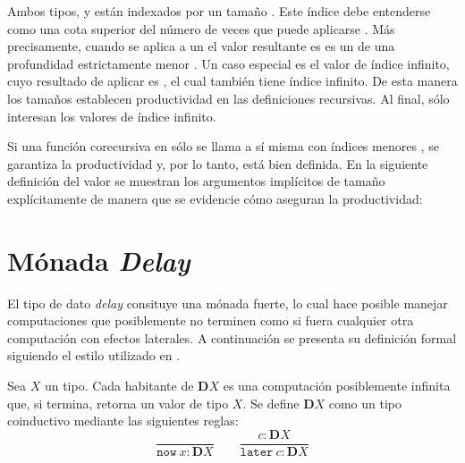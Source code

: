 Ambos tipos,  y  están indexados por un tamaño . Este índice debe entenderse como una cota superior del número de veces que puede aplicarse . Más precisamente, cuando se aplica  a un  \AgdaSymbol{:}   el valor resultante es es un  \AgdaSymbol{:}   de una profundidad estrictamente menor  \AgdaSymbol{<} . Un caso especial es el valor  \AgdaSymbol{:}  \AgdaArgument{$\infty$} de índice infinito, cuyo resultado de aplicar  es  \AgdaSymbol{:}  \AgdaArgument{$\infty$}, el cual también tiene índice infinito. De esta manera los tamaños establecen productividad en las definiciones recursivas. Al final, sólo interesan los valores  \AgdaSymbol{:}  \AgdaArgument{$\infty$} de índice infinito.

Si una función corecursiva en   sólo se llama a sí misma con índices menores  \AgdaSymbol{<} , se garantiza la productividad y, por lo tanto, está bien definida. En la siguiente definición del valor  se muestran los argumentos implícitos de tamaño explícitamente de manera que se evidencie cómo aseguran la productividad:



\section{Mónada \textit{Delay}}\label{delay:delay}

El tipo de dato \textit{delay} consituye una mónada fuerte, lo cual hace posible manejar computaciones que posiblemente no terminen como si fuera cualquier otra computación con efectos laterales. A continuación se presenta su definición formal siguiendo el estilo utilizado en \cite{chapman:2019}. 

\begin{definition}
Sea $X$ un tipo. Cada habitante de $\mathbf{D} X$ es una computación posiblemente infinita que, si termina, retorna un valor de tipo $X$. Se define $\mathbf{D} X$ como un tipo coinductivo mediante las siguientes reglas:
\begin{equation*}
\dfrac{}{\mathtt{now} \ x : \mathbf{D} X} 	\qquad  	\dfrac{c : \mathbf{D} X}{\mathtt{later} \ c : \mathbf{D} X}
\end{equation*}
\end{definition}

